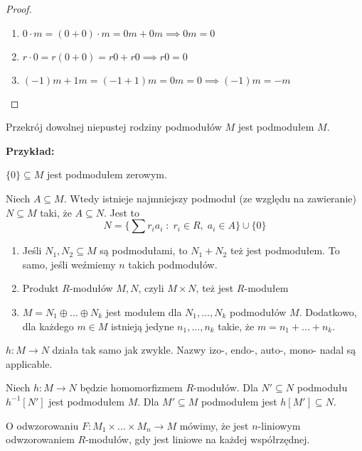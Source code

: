 \begin{proof}$ $\newline
  \begin{enumerate}
    \item $0\cdot m=(0+0)\cdot m=0m+0m\implies 0m=0$
    \item $r\cdot 0=r(0+0)=r0+r0\implies r0=0$
    \item $(-1)m+1m=(-1+1)m=0m=0\implies (-1)m=-m$
  \end{enumerate}
\end{proof}

\begin{remark}
Przekrój dowolnej niepustej rodziny podmodułów $M$ jest podmodułem $M$.
\end{remark}

\setcounter{theorem}{5}

\textbf{Przykład:}

$\{0\}\subseteq M$ jest podmodułem zerowym.

\begin{conclusion}
    Niech $A\subseteq M$. Wtedy istnieje najmniejszy podmoduł (ze względu na zawieranie) $N\subseteq M$ taki, że $A\subseteq N$. Jest to 
    $$N=\{\sum r_ia_i\;:\;r_i\in R,\;a_i\in A\}\cup\{0\}$$
\end{conclusion}

\begin{enumerate}
    \item Jeśli $N_1,N_2\subseteq M$ są podmodułami, to $N_1+N_2$ też jest podmodułem. To samo, jeśli weźmiemy $n$ takich podmodułów.
    \item Produkt $R$-modułów $M,N$, czyli $M\times N$, też jest $R$-modułem
    \item $M=N_1\oplus...\oplus N_k$ jest modułem dla $N_1,...,N_k$ podmodułów $M$. Dodatkowo, dla każdego $m\in M$ istnieją jedyne $n_1,...,n_k$ takie, że $m=n_1+...+n_k$.
\end{enumerate}

 $h:M\to N$ działa tak samo jak zwykle. Nazwy izo-, endo-, auto-, mono- nadal są applicable.

Niech $h:M\to N$ będzie homomorfizmem $R$-modułów. Dla $N'\subseteq N$ podmodułu $h^{-1}[N']$ jest podmodułem $M$. Dla $M'\subseteq M$ podmodułem jest $h[M']\subseteq N$.

O odwzorowaniu $F:M_1\times...\times M_n\to M$ mówimy, że jest $n$-liniowym odwzorowaniem $R$-modułów, gdy jest liniowe na każdej współrzędnej.

